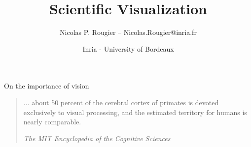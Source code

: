 \documentclass[10pt,aspectratio=169]{beamer}
\title{Scientific Visualization}
\date{Inria - University of Bordeaux}
\author{Nicolas P. Rougier -- Nicolas.Rougier@inria.fr}
\institute{\today}
\begin{document}
\maketitle


\begin{frame}{On the importance of vision}

  \begin{quote}
    ... about 50 percent of the cerebral cortex of primates is devoted
    exclusively to visual processing, and the estimated territory for humans is
    nearly comparable.
    \begin{flushright}
      \em \small The MIT Encyclopedia of the Cognitive Sciences
    \end{flushright}
  \end{quote}
\end{frame}
\end{document}
